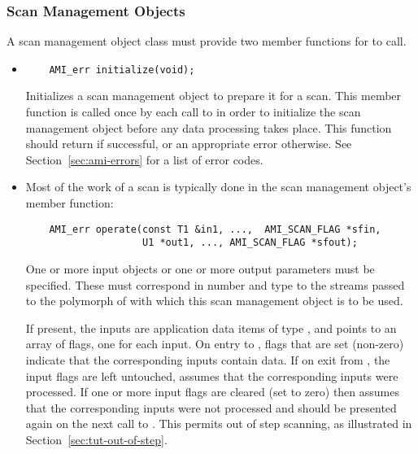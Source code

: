 \subsubsection{Scan Management Objects}  

A scan management object class must provide two member
functions for  to call. 

\begin{itemize}
    
    \item {}
\begin{verbatim}
    AMI_err initialize(void);
\end{verbatim}
    Initializes a scan management object to prepare
    it for a scan.  This member function is called once by
    each call to  in order to initialize
    the scan management object before any data processing
    takes place.  This function should return
     if successful, or an
    appropriate error otherwise. See
    Section~\ref{sec:ami-errors} for a list of error codes.
    
    \item {}
    
    Most of the work of a scan is typically done in the scan
    management object's  member function:
\begin{verbatim}
    AMI_err operate(const T1 &in1, ...,  AMI_SCAN_FLAG *sfin,
                    U1 *out1, ..., AMI_SCAN_FLAG *sfout);
\end{verbatim}
    
    One or more input objects or one or more output
    parameters must be specified.  These must correspond in
    number and type to the streams passed to the polymorph
    of  with which this scan management
    object is to be used.
    
    If present, the inputs  are application
    data items of type , and  points
    to an array of flags, one for each input.  On entry to
    , flags that are set (non-zero)
    indicate that the corresponding inputs contain data.  If
    on exit from , the input flags are
    left untouched,  assumes that the
    corresponding inputs were processed.  If one or more
    input flags are cleared (set to zero) then
     assumes that the corresponding
    inputs were not processed and should be presented again
    on the next call to .  This permits
    out of step scanning, as
    illustrated in Section~\ref{sec:tut-out-of-step}.
    

\end{itemize}
